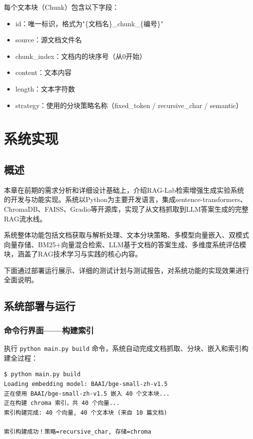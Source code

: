 \documentclass[10pt,a4paper]{article}
\begin{document}
每个文本块（Chunk）包含以下字段：
\begin{itemize}
\item id：唯一标识，格式为"\{文档名\}\_chunk\_\{编号\}"
\item source：源文档文件名
\item chunk\_index：文档内的块序号（从0开始）
\item content：文本内容
\item length：文本字符数
\item strategy：使用的分块策略名称（fixed\_token / recursive\_char / semantic）
\end{itemize}

\section{系统实现}

\subsection{概述}

本章在前期的需求分析和详细设计基础上，介绍RAG-Lab检索增强生成实验系统的开发与功能实现。系统以Python为主要开发语言，集成sentence-transformers、ChromaDB、FAISS、Gradio等开源库，实现了从文档抓取到LLM答案生成的完整RAG流水线。

系统整体功能包括文档获取与解析处理、文本分块策略、多模型向量嵌入、双模式向量存储、BM25+向量混合检索、LLM基于文档的答案生成、多维度系统评估模块，涵盖了RAG技术学习与实践的核心内容。

下面通过部署运行展示、详细的测试计划与测试报告，对系统功能的实现效果进行全面说明。

\subsection{系统部署与运行}

\subsubsection{命令行界面——构建索引}

执行 \texttt{python main.py build} 命令，系统自动完成文档抓取、分块、嵌入和索引构建全过程：

\begin{verbatim}
$ python main.py build
Loading embedding model: BAAI/bge-small-zh-v1.5
正在使用 BAAI/bge-small-zh-v1.5 嵌入 40 个文本块...
正在构建 chroma 索引，共 40 个向量...
索引构建完成: 40 个向量, 40 个文本块 (来自 10 篇文档)

索引构建成功！策略=recursive_char, 存储=chroma
\end{verbatim}
\end{document}
